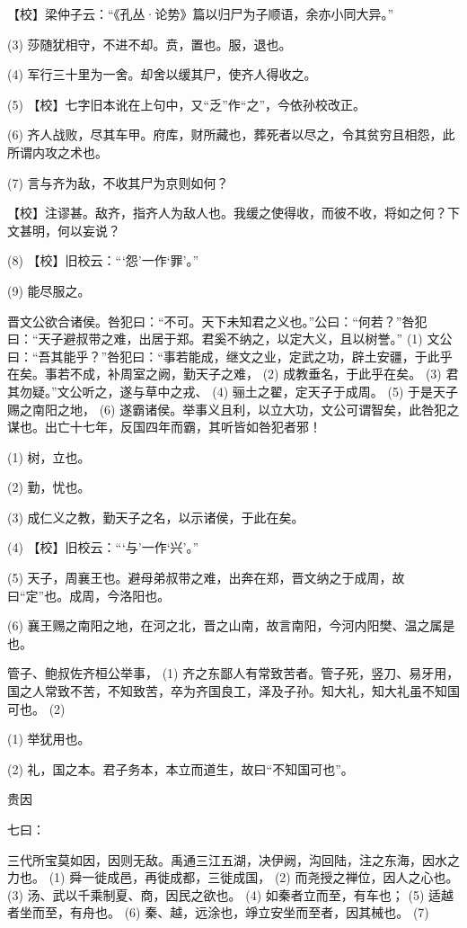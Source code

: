 \documentclass[12pt,UTF8]{ctexbook}
\begin{document}
【校】梁仲子云：“《孔丛·论势》篇以归尸为子顺语，余亦小同大异。”

(3) 莎随犹相守，不进不却。贲，置也。服，退也。

(4) 军行三十里为一舍。却舍以缓其尸，使齐人得收之。

(5) 【校】七字旧本讹在上句中，又“乏”作“之”，今依孙校改正。

(6) 齐人战败，尽其车甲。府库，财所藏也，葬死者以尽之，令其贫穷且相怨，此所谓内攻之术也。

(7) 言与齐为敌，不收其尸为京则如何？

【校】注谬甚。敌齐，指齐人为敌人也。我缓之使得收，而彼不收，将如之何？下文甚明，何以妄说？

(8) 【校】旧校云：“‘怨’一作‘罪’。”

(9) 能尽服之。

晋文公欲合诸侯。咎犯曰：“不可。天下未知君之义也。”公曰：“何若？”咎犯曰：“天子避叔带之难，出居于郑。君奚不纳之，以定大义，且以树誉。” (1) 文公曰：“吾其能乎？”咎犯曰：“事若能成，继文之业，定武之功，辟土安疆，于此乎在矣。事若不成，补周室之阙，勤天子之难， (2) 成教垂名，于此乎在矣。 (3) 君其勿疑。”文公听之，遂与草中之戎、 (4) 骊土之翟，定天子于成周。 (5) 于是天子赐之南阳之地， (6) 遂霸诸侯。举事义且利，以立大功，文公可谓智矣，此咎犯之谋也。出亡十七年，反国四年而霸，其听皆如咎犯者邪！

(1) 树，立也。

(2) 勤，忧也。

(3) 成仁义之教，勤天子之名，以示诸侯，于此在矣。

(4) 【校】旧校云：“‘与’一作‘兴’。”

(5) 天子，周襄王也。避母弟叔带之难，出奔在郑，晋文纳之于成周，故曰“定”也。成周，今洛阳也。

(6) 襄王赐之南阳之地，在河之北，晋之山南，故言南阳，今河内阳樊、温之属是也。

管子、鲍叔佐齐桓公举事， (1) 齐之东鄙人有常致苦者。管子死，竖刀、易牙用，国之人常致不苦，不知致苦，卒为齐国良工，泽及子孙。知大礼，知大礼虽不知国可也。 (2)

(1) 举犹用也。

(2) 礼，国之本。君子务本，本立而道生，故曰“不知国可也”。





贵因


七曰：

三代所宝莫如因，因则无敌。禹通三江五湖，决伊阙，沟回陆，注之东海，因水之力也。 (1) 舜一徙成邑，再徙成都，三徙成国， (2) 而尧授之禅位，因人之心也。 (3) 汤、武以千乘制夏、商，因民之欲也。 (4) 如秦者立而至，有车也； (5) 适越者坐而至，有舟也。 (6) 秦、越，远涂也，竫立安坐而至者，因其械也。 (7)
\end{document}
